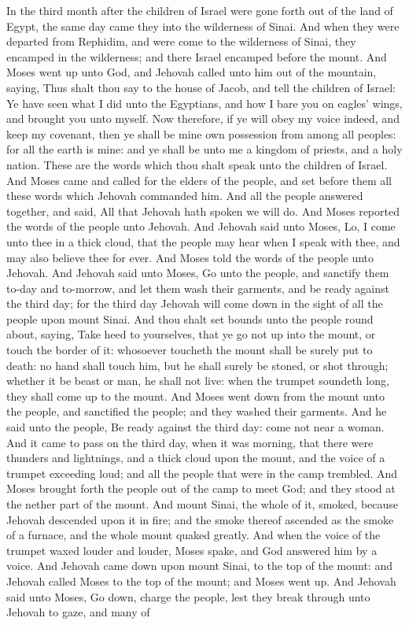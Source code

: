 In the third month after the children of Israel were gone forth out of the land of Egypt, the same day came they into the wilderness of Sinai. And when they were departed from Rephidim, and were come to the wilderness of Sinai, they encamped in the wilderness; and there Israel encamped before the mount. And Moses went up unto God, and Jehovah called unto him out of the mountain, saying, Thus shalt thou say to the house of Jacob, and tell the children of Israel: Ye have seen what I did unto the Egyptians, and how I bare you on eagles’ wings, and brought you unto myself. Now therefore, if ye will obey my voice indeed, and keep my covenant, then ye shall be mine own possession from among all peoples: for all the earth is mine: and ye shall be unto me a kingdom of priests, and a holy nation. These are the words which thou shalt speak unto the children of Israel.  And Moses came and called for the elders of the people, and set before them all these words which Jehovah commanded him. And all the people answered together, and said, All that Jehovah hath spoken we will do. And Moses reported the words of the people unto Jehovah. And Jehovah said unto Moses, Lo, I come unto thee in a thick cloud, that the people may hear when I speak with thee, and may also believe thee for ever. And Moses told the words of the people unto Jehovah. And Jehovah said unto Moses, Go unto the people, and sanctify them to-day and to-morrow, and let them wash their garments, and be ready against the third day; for the third day Jehovah will come down in the sight of all the people upon mount Sinai. And thou shalt set bounds unto the people round about, saying, Take heed to yourselves, that ye go not up into the mount, or touch the border of it: whosoever toucheth the mount shall be surely put to death: no hand shall touch him, but he shall surely be stoned, or shot through; whether it be beast or man, he shall not live: when the trumpet soundeth long, they shall come up to the mount. And Moses went down from the mount unto the people, and sanctified the people; and they washed their garments. And he said unto the people, Be ready against the third day: come not near a woman.  And it came to pass on the third day, when it was morning, that there were thunders and lightnings, and a thick cloud upon the mount, and the voice of a trumpet exceeding loud; and all the people that were in the camp trembled. And Moses brought forth the people out of the camp to meet God; and they stood at the nether part of the mount. And mount Sinai, the whole of it, smoked, because Jehovah descended upon it in fire; and the smoke thereof ascended as the smoke of a furnace, and the whole mount quaked greatly. And when the voice of the trumpet waxed louder and louder, Moses spake, and God answered him by a voice. And Jehovah came down upon mount Sinai, to the top of the mount: and Jehovah called Moses to the top of the mount; and Moses went up. And Jehovah said unto Moses, Go down, charge the people, lest they break through unto Jehovah to gaze, and many of 